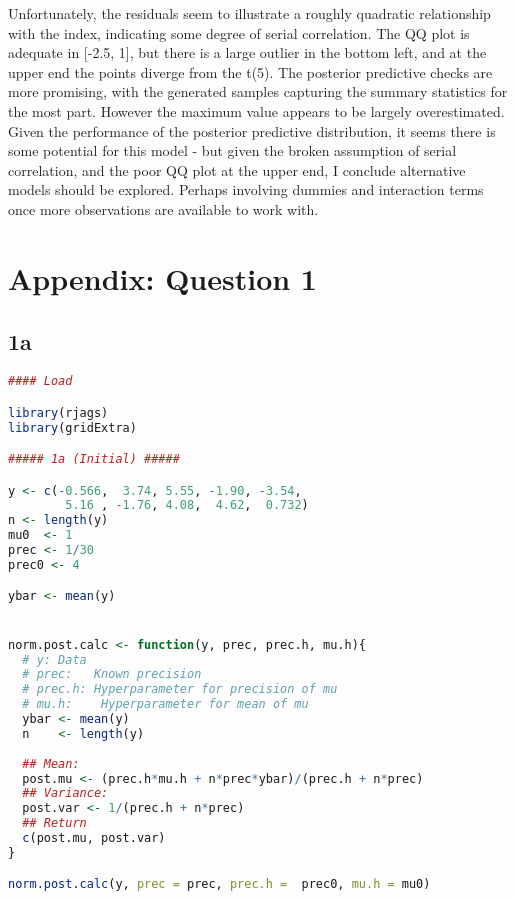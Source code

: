 \documentclass{article}
\renewcommand\thesection{\arabic{section}}
\renewcommand\thesubsection{\thesection.\alph{subsection}}
\begin{document}
Unfortunately, the residuals seem to illustrate a roughly quadratic relationship with the index, indicating some degree of serial correlation. The QQ plot is adequate in [-2.5, 1], but there is a large outlier in the bottom left, and at the upper end the points diverge from the t(5). The posterior predictive checks are more promising, with the generated samples capturing the summary statistics for the most part. However the maximum value appears to be largely overestimated. Given the performance of the posterior predictive distribution, it seems there is some potential for this model - but given the broken assumption of serial correlation, and the poor QQ plot at the upper end, I conclude alternative models should be explored. Perhaps involving dummies and interaction terms once more observations are available to work with. 


\newpage


\newpage
\renewcommand\thesubsection{\thesection.\arabic{subsection}}

\appendix

\section{Appendix: Question 1} \label{appA1}
\subsection{1a} \label{appA1a}
\begin{lstlisting}[language=R]
#### Load

library(rjags)
library(gridExtra)

##### 1a (Initial) #####

y <- c(-0.566,  3.74, 5.55, -1.90, -3.54, 
        5.16 , -1.76, 4.08,  4.62,  0.732)
n <- length(y)
mu0  <- 1
prec <- 1/30
prec0 <- 4

ybar <- mean(y)


norm.post.calc <- function(y, prec, prec.h, mu.h){
  # y: Data
  # prec:   Known precision
  # prec.h: Hyperparameter for precision of mu
  # mu.h:    Hyperparameter for mean of mu
  ybar <- mean(y)
  n    <- length(y)
  
  ## Mean:
  post.mu <- (prec.h*mu.h + n*prec*ybar)/(prec.h + n*prec)
  ## Variance:
  post.var <- 1/(prec.h + n*prec)
  ## Return
  c(post.mu, post.var)
}

norm.post.calc(y, prec = prec, prec.h =  prec0, mu.h = mu0)
\end{lstlisting}
\end{document}
